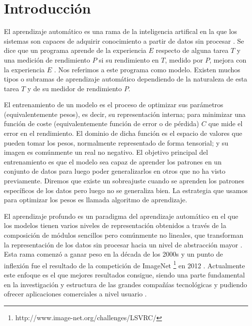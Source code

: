 \section{Introducción}

El aprendizaje automático es una rama de la inteligencia artifical en la que los sistemas son capaces de adquirir conocimiento a partir de datos sin procesar \cite{GoodFellowBook}. Se dice que un programa aprende de la experiencia $E$ respecto de alguna tarea $T$ y una medición de rendimiento $P$ si su rendimiento en $T$, medido por $P$, mejora con la experiencia $E$ \cite{mitchell1997machine}. Nos referimos a este programa como modelo. Existen muchos tipos o subramas de aprendizaje automático dependiendo de la naturaleza de esta tarea $T$ y de su medidor de rendimiento $P$. 

El entrenamiento de un modelo es el proceso de optimizar sus parámetros (equivalentemente pesos), es decir, su representación interna; para minimizar una función de coste (equivalentemente función de error o de pérdida) $C$ que mide el error en el rendimiento. El dominio de dicha función es el espacio de valores que pueden tomar los pesos, normalmente representado de forma tensorial; y su imagen es comúnmente un real no negativo. El objetivo principal del entrenamiento es que el modelo sea capaz de aprender los patrones en un conjunto de datos para luego poder generalizarlos en otros que no ha visto previamente. Diremos que existe un sobreajuste cuando se aprenden los patrones específicos de los datos pero luego no se generaliza bien. La estrategia que usamos para optimizar los pesos es llamada algoritmo de aprendizaje.

El aprendizaje profundo es un paradigma del aprendizaje automático en el que los modelos tienen varios niveles de representación obtenidos a través de la composición de módulos sencillos pero comúnmente no lineales, que transforman la representación de los datos sin procesar hacia un nivel de abstracción mayor \cite{lecun2015deep}. Esta rama comenzó a ganar peso en la década de los 2000s y un punto de inflexión fue el resultado de la competición de ImageNet \footnote{http://www.image-net.org/challenges/LSVRC/} en 2012 \cite{NIPS2012_c399862d}. Actualmente este enfoque es el que mejores resultados consigue, siendo una parte fundamental en la investigación y estructura de las grandes compañías tecnológicas y pudiendo ofrecer aplicaciones comerciales a nivel usuario \cite{Sejnowski18, lecunnDeepForAI}.

